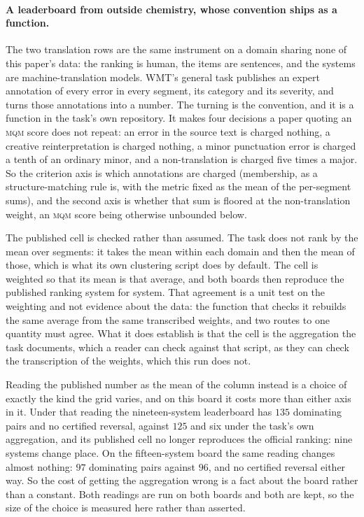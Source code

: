 \paragraph{A leaderboard from outside chemistry, whose convention ships as a function.} The two
translation rows are the same instrument on a domain sharing none of this paper's data: the ranking
is human, the items are sentences, and the systems are machine-translation models. WMT's general
task publishes an expert annotation of every error in every segment, its category and its severity,
and turns those annotations into a number. The turning is the convention, and it is a function in
the task's own repository. It makes four decisions a paper quoting an \textsc{mqm} score does not
repeat: an error in the source text is charged nothing, a creative reinterpretation is charged
nothing, a minor punctuation error is charged a tenth of an ordinary minor, and a non-translation is
charged five times a major. So the criterion axis is which annotations are charged (membership,
as a structure-matching rule is, with the metric fixed as the mean of the per-segment sums), and
the second axis is whether that sum is floored at the non-translation weight, an \textsc{mqm} score
being otherwise unbounded below.

The published cell is checked rather than assumed. The task does not rank by the mean over
segments: it takes the mean within each domain and then the mean of those, which is what its own
clustering script does by default. The cell is weighted so that its mean is that average, and both
boards then reproduce the published ranking system for system. That agreement is a unit test on the
weighting and not evidence about the data: the function that checks it rebuilds the same average
from the same transcribed weights, and two routes to one quantity must agree. What it does
establish is that the cell is the aggregation the task documents, which a reader can check against that script, as they can check the transcription of the weights, which this run does not.

Reading the published number as the mean of the column instead is a choice of exactly the kind the
grid varies, and on this board it costs more than either axis in it. Under that reading the
nineteen-system leaderboard has $135$ dominating pairs and no certified reversal, against $125$ and
six under the task's own aggregation, and its published cell no longer reproduces the official
ranking: nine systems change place. On the fifteen-system board the same reading changes almost
nothing: $97$ dominating pairs against $96$, and no certified reversal either way. So the cost
of getting the aggregation wrong is a fact about the board rather than a constant. Both readings are
run on both boards and both are kept, so the size of the choice is measured here rather than
asserted.

